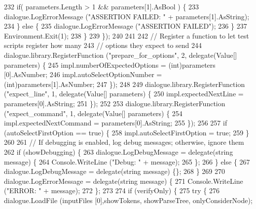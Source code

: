 \begin{DoxyCode}
232                     \textcolor{keywordflow}{if}( parameters.Length > 1 && parameters[1].AsBool ) \{
233                         dialogue.LogErrorMessage (\textcolor{stringliteral}{"ASSERTION FAILED: "} + parameters[1].AsString);
234                     \} \textcolor{keywordflow}{else} \{
235                         dialogue.LogErrorMessage (\textcolor{stringliteral}{"ASSERTION FAILED"});
236                     \}
237                     Environment.Exit(1);
238                 \}
239             \});
240 
241 
242             \textcolor{comment}{// Register a function to let test scripts register how many}
243             \textcolor{comment}{// options they expect to send}
244             dialogue.library.RegisterFunction (\textcolor{stringliteral}{"prepare\_for\_options"}, 2, delegate(Value[] parameters) \{
245                 impl.numberOfExpectedOptions = (int)parameters [0].AsNumber;
246                 impl.autoSelectOptionNumber = (int)parameters[1].AsNumber;
247             \});
248 
249             dialogue.library.RegisterFunction (\textcolor{stringliteral}{"expect\_line"}, 1, delegate(Value[] parameters) \{
250                 impl.expectedNextLine = parameters[0].AsString;
251             \});
252 
253             dialogue.library.RegisterFunction (\textcolor{stringliteral}{"expect\_command"}, 1, delegate(Value[] parameters) \{
254                 impl.expectedNextCommand = parameters[0].AsString;
255             \});
256 
257             \textcolor{keywordflow}{if} (autoSelectFirstOption == \textcolor{keyword}{true}) \{
258                 impl.autoSelectFirstOption = \textcolor{keyword}{true};
259             \}
260 
261             \textcolor{comment}{// If debugging is enabled, log debug messages; otherwise, ignore them}
262             \textcolor{keywordflow}{if} (showDebugging) \{
263                 dialogue.LogDebugMessage = delegate(\textcolor{keywordtype}{string} message) \{
264                     Console.WriteLine (\textcolor{stringliteral}{"Debug: "} + message);
265                 \};
266             \} \textcolor{keywordflow}{else} \{
267                 dialogue.LogDebugMessage = delegate(\textcolor{keywordtype}{string} message) \{\};
268             \}
269 
270             dialogue.LogErrorMessage = delegate(\textcolor{keywordtype}{string} message) \{
271                 Console.WriteLine (\textcolor{stringliteral}{"ERROR: "} + message);
272             \};
273 
274             \textcolor{keywordflow}{if} (verifyOnly) \{
275                 \textcolor{keywordflow}{try} \{
276                     dialogue.LoadFile (inputFiles [0],showTokens, showParseTree, onlyConsiderNode);

\end{DoxyCode}
